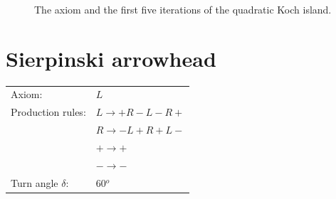 \documentclass[11pt]{article}
\begin{document}
\begin{figure}[H]
  \caption{The axiom and the first five iterations of the quadratic
    Koch island.}
\end{figure}





\section{Sierpinski arrowhead}

\begin{tabular}{ll}
Axiom: & $L$ \\
Production rules: & $L \to + R - L - R +$ \\
& $R \to - L + R + L - $ \\
& $+ \to +$ \\
& $- \to -$ \\
Turn angle $\delta$: & 60$^o$ \\
\end{tabular}
\end{document}
